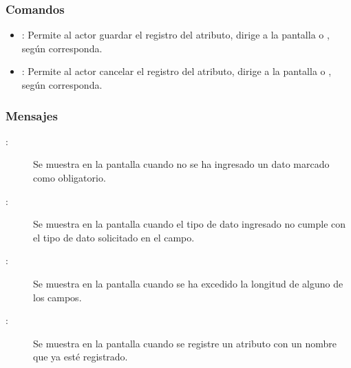 \subsubsection{Comandos}
\begin{itemize}
	\item {}: Permite al actor guardar el registro del atributo, dirige a la pantalla  o , según corresponda.
	\item {}: Permite al actor cancelar el registro del atributo, dirige a la pantalla  o , según corresponda.
\end{itemize}

\subsubsection{Mensajes}

	
\begin{description}
	\item[:] Se muestra en la pantalla  cuando no se ha ingresado un dato marcado como obligatorio.
	\item[:] Se muestra en la pantalla  cuando el tipo de dato ingresado no cumple con el tipo de dato solicitado en el campo.
	\item[:] Se muestra en la pantalla  cuando se ha excedido la longitud de alguno de los campos.
	\item[:] Se muestra en la pantalla  cuando se registre un atributo con un nombre que ya esté registrado.
\end{description}

